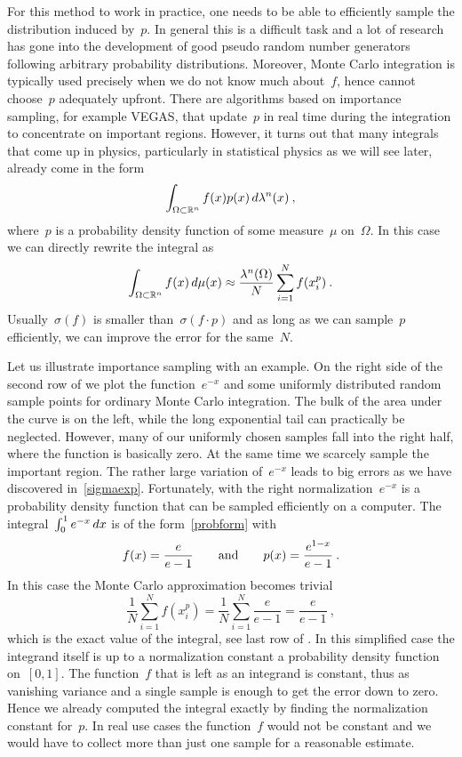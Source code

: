 For this method to work in practice, one needs to be able to efficiently sample
the distribution induced by~$p$. In general this is a difficult task and a lot
of research has gone into the development of good pseudo random number
generators following arbitrary probability distributions. Moreover, Monte Carlo
integration is typically used precisely when we do not know much about~$f$,
hence cannot choose~$p$ adequately upfront. There are algorithms based on
importance sampling, for example VEGAS, that update~$p$ in real time during the
integration to concentrate on important regions. However, it turns out that many
integrals that come up in physics, particularly in statistical physics as we
will see later, already come in the form
%
\begin{equation}\label{probform}
  \int_{\Omega \subset \mathbb{R}^n} f(x) p(x) \,d\lambda^n(x)\:,
\end{equation}
%
where~$p$ is a probability density function of some measure~$\mu$ on~$\Omega$.
In this case we can directly rewrite the integral as
%
\begin{equation}
  \int_{\Omega \subset \mathbb{R}^n} f(x) \,d\mu(x) \approx
  \frac{\lambda^n(\Omega)}{N} \sum_{i=1}^N {f(x_i^p)}\:.
\end{equation}
%
Usually~$\sigma(f)$ is smaller than~$\sigma(f\cdot p)$ and as long as we can
sample~$p$ efficiently, we can improve the error for the same~$N$.

Let us illustrate importance sampling with an example. On the right side of the
second row of  we plot the function~$e^{-x}$ and some
uniformly distributed random sample points for ordinary Monte Carlo integration.
The bulk of the area under the curve is on the left, while the long exponential
tail can practically be neglected. However, many of our uniformly chosen samples
fall into the right half, where the function is basically zero. At the same
time we scarcely sample the important region. The rather large variation
of~$e^{-x}$ leads to big errors as we have discovered in~\eqref{sigmaexp}.
Fortunately, with the right normalization~$e^{-x}$ is a probability density
function that can be sampled efficiently on a computer. The integral~$\int_0^1
e^{-x} \,dx$ is of the form~\eqref{probform} with
%
\begin{equation}
  f(x) =\frac{e}{e-1} \qquad\text{and}\qquad p(x) =\frac{e^{1-x}}{e-1}\:.
\end{equation}
%
In this case the Monte Carlo approximation becomes trivial
%
\begin{equation}
  \frac{1}{N} \sum_{i=1}^N f(x_i^p) = \frac{1}{N} \sum_{i=1}^N \frac{e}{e-1} =
  \frac{e}{e-1} \:,
\end{equation}
%
which is the exact value of the integral, see last row of . In
this simplified case the integrand itself is up to a normalization constant a
probability density function on~$[0,1]$. The function~$f$ that is left as an
integrand is constant, thus as vanishing variance and a single sample is enough
to get the error down to zero. Hence we already computed the integral exactly by
finding the normalization constant for~$p$. In real use cases the function~$f$
would not be constant and we would have to collect more than just one sample for
a reasonable estimate.

